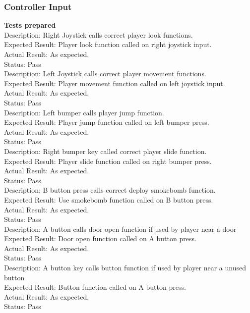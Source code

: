 \documentclass[11pt,a4paper]{article}
\begin{document}
\subsubsection{Controller Input}
\textbf{Tests prepared} \\
Description: Right Joystick calls correct player look functions.\\
Expected Result: Player look function called on right joystick input.\\
Actual Result: As expected.\\
Status: Pass
\smallskip\\
Description: Left Joystick calls correct player movement functions.\\
Expected Result: Player movement function called on left joystick input.\\
Actual Result: As expected.\\
Status: Pass
\smallskip\\
Description: Left bumper calls player jump function.\\
Expected Result: Player jump function called on left bumper press.\\
Actual Result: As expected.\\
Status: Pass
\smallskip\\
Description: Right bumper key called correct player slide function.\\
Expected Result: Player slide function called on right bumper press.\\
Actual Result: As expected.\\
Status: Pass
\smallskip\\
Description: B button press calls correct deploy smokebomb function.\\
Expected Result: Use smokebomb function called on B button press.\\
Actual Result: As expected.\\
Status: Pass
\smallskip\\
Description: A button calls door open function if used by player near a door\\
Expected Result: Door open function called on A button press.\\
Actual Result: As expected.\\
Status: Pass
\smallskip\\
Description: A button key calls button function if used by player near a unused button\\
Expected Result: Button function called on A button press.\\
Actual Result: As expected.\\
Status: Pass
\end{document}
